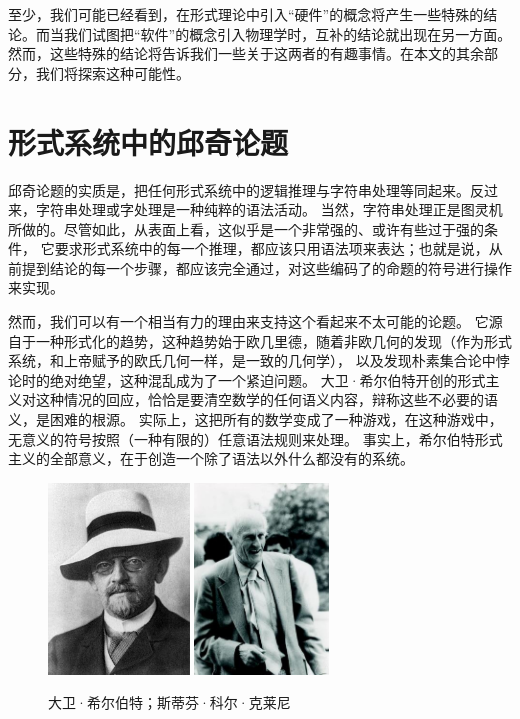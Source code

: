 \documentclass[a4paper,12pt]{article}
\begin{document}
至少，我们可能已经看到，在形式理论中引入“硬件”的概念将产生一些特殊的结论。而当我们试图把“软件”的概念引入物理学时，互补的结论就出现在另一方面。
然而，这些特殊的结论将告诉我们一些关于这两者的有趣事情。在本文的其余部分，我们将探索这种可能性。

\section{形式系统中的邱奇论题}

邱奇论题的实质是，把任何形式系统中的逻辑推理与字符串处理等同起来。反过来，字符串处理或字处理是一种纯粹的语法活动。
当然，字符串处理正是图灵机所做的。尽管如此，从表面上看，这似乎是一个非常强的、或许有些过于强的条件，
它要求形式系统中的每一个推理，都应该只用语法项来表达；也就是说，从前提到结论的每一个步骤，都应该完全通过，对这些编码了的命题的符号进行操作来实现。

然而，我们可以有一个相当有力的理由来支持这个看起来不太可能的论题。
它源自于一种形式化的趋势，这种趋势始于欧几里德，随着非欧几何的发现（作为形式系统，和上帝赋予的欧氏几何一样，是一致的几何学），
以及发现朴素集合论中悖论时的绝对绝望，这种混乱成为了一个紧迫问题。
大卫·希尔伯特开创的形式主义对这种情况的回应，恰恰是要清空数学的任何语义内容，辩称这些不必要的语义，是困难的根源。
实际上，这把所有的数学变成了一种游戏，在这种游戏中，无意义的符号按照（一种有限的）任意语法规则来处理。
事实上，希尔伯特形式主义的全部意义，在于创造一个除了语法以外什么都没有的系统。

\begin{figure}[ht]
\centering
\includegraphics[height=2.0in]{images/hilbert.jpg}
\includegraphics[height=2.0in]{images/kleene.jpg}
\caption{大卫·希尔伯特；斯蒂芬·科尔·克莱尼}
\end{figure}
\end{document}
